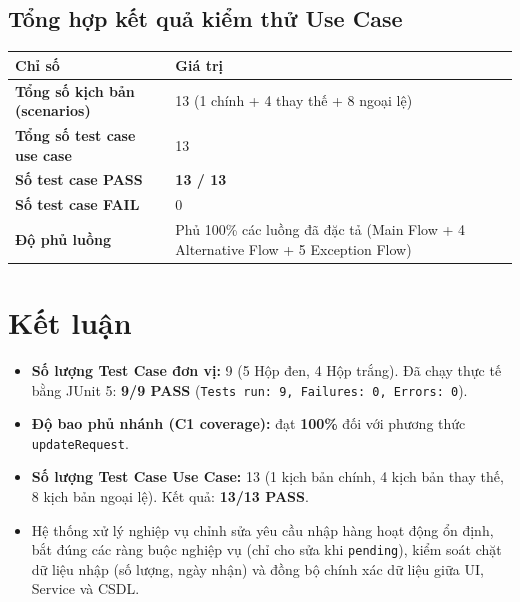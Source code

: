 \documentclass[12pt,a4paper]{article}
\begin{document}
\subsection{Tổng hợp kết quả kiểm thử Use Case}
\begin{table}[H]
\centering
\small
\begin{tabularx}{\textwidth}{|>{\bfseries}p{5.2cm}|Y|}
\hline
{}\normalfont\textbf{Chỉ số} & \textbf{Giá trị}\\ \hline
Tổng số kịch bản (scenarios) & 13 (1 chính + 4 thay thế + 8 ngoại lệ)\\ \hline
Tổng số test case use case & 13\\ \hline
Số test case PASS & \textbf{13 / 13}\\ \hline
Số test case FAIL & 0\\ \hline
Độ phủ luồng & Phủ 100\% các luồng đã đặc tả (Main Flow + 4 Alternative Flow + 5 Exception Flow)\\ \hline
\end{tabularx}
\end{table}

\section{Kết luận}
\begin{itemize}[leftmargin=*]
  \item \textbf{Số lượng Test Case đơn vị:} 9 (5 Hộp đen, 4 Hộp trắng). Đã chạy thực tế bằng JUnit 5: \textbf{9/9 PASS} (\texttt{Tests run: 9, Failures: 0, Errors: 0}).
  \item \textbf{Độ bao phủ nhánh (C1 coverage):} đạt \textbf{100\%} đối với phương thức \texttt{updateRequest}.
  \item \textbf{Số lượng Test Case Use Case:} 13 (1 kịch bản chính, 4 kịch bản thay thế, 8 kịch bản ngoại lệ). Kết quả: \textbf{13/13 PASS}.
  \item Hệ thống xử lý nghiệp vụ chỉnh sửa yêu cầu nhập hàng hoạt động ổn định, bắt đúng các ràng buộc nghiệp vụ (chỉ cho sửa khi \texttt{pending}), kiểm soát chặt dữ liệu nhập (số lượng, ngày nhận) và đồng bộ chính xác dữ liệu giữa UI, Service và CSDL.
\end{itemize}
\end{document}

